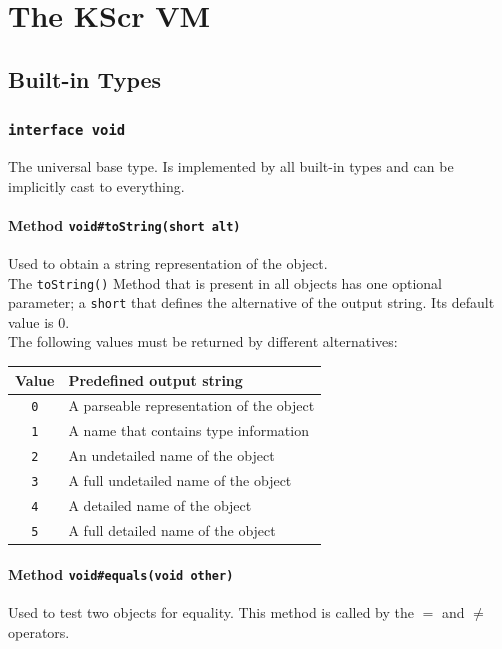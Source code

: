 \documentclass{docs}
\begin{document}
    \pagebreak
    \section{The KScr VM}
    
    \subsection{Built-in Types}

    \label{typeVoid}
    \subsubsection{\texttt{interface void}}
    The universal base type. Is implemented by all built-in types and can be implicitly cast to everything.

    \paragraph{Method \texttt{void\#toString(short alt)}}
    Used to obtain a string representation of the object.
    \\
    The \texttt{toString()} Method that is present in all objects has one optional parameter; a \texttt{short} that defines the alternative of the output string. Its default value is 0.
    \\
    The following values must be returned by different alternatives:
    \begin{center}
    \begin{tabular}{c|l}
        Value & Predefined output string \\
        \hline
        \texttt{0} & A parseable representation of the object \\
        \texttt{1} & A name that contains type information \\
        \texttt{2} & An undetailed name of the object \\
        \texttt{3} & A full undetailed name of the object \\
        \texttt{4} & A detailed name of the object \\
        \texttt{5} & A full detailed name of the object
    \end{tabular}
    \end{center}

    \paragraph{Method \texttt{void\#equals(void other)}}
    Used to test two objects for equality.
    This method is called by the \begin{math}=\end{math} and \begin{math}\neq\end{math} operators.
\end{document}
